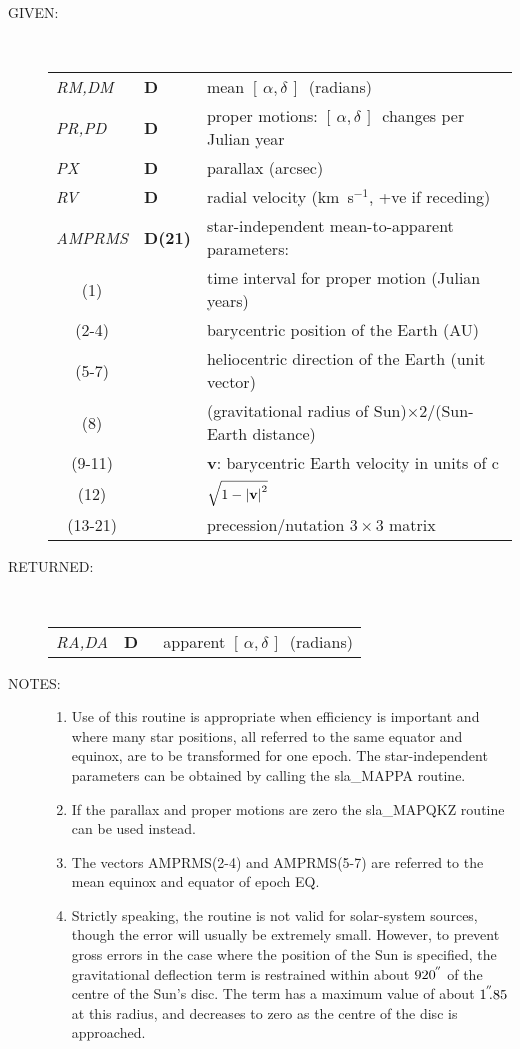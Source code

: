 \documentclass[11pt,twoside]{article}
\newcommand{\radec}     {$[\,\alpha,\delta\,]$}
\newcommand{\arcsec}[2] {\arcseci{#1}$\hspace{-0.4em}.#2$}
\newcommand{\arcsec}[2] {
      {$#1\hspace{-0.05em}^{'\hspace{-0.1em}'}\hspace{-0.4em}.#2$}
   }
\newcommand{\arcseci}[1] {$#1\hspace{-0.05em}$\raisebox{-0.5ex}
                         {$^{'\hspace{-0.1em}'}$}}
\renewcommand{\arcseci}[1] {$#1\hspace{-0.05em}^{'\hspace{-0.1em}'}$}
\newlength{\oldspacing}
\newcommand{\args}[2]
{
  \goodbreak
  \setlength{\oldspacing}{\topsep}
  \setlength{\topsep}{0.3ex}
  \begin{description}
  \item[#1]:\\[1.5ex]
    \begin{tabular}{p{7em}p{6em}p{22em}}
      #2
    \end{tabular}
  \end{description}
  \setlength{\topsep}{\oldspacing}
}
\renewcommand{\args}[2]
   {
     \begin{description}
        \item[#1:]\\
        \begin{tabular}{p{7em}p{6em}l}
           #2
        \end{tabular}
     \end{description}
   }
\newcommand{\spec}[3]
{
  {\em {#1}} & {\bf \mbox{#2}} & {#3}
}
\newcommand{\specel}[2]
{
  \multicolumn{1}{c}{#1} & {} & {#2}
}
\newcommand{\notes}[1]
{
  \goodbreak
  \setlength{\oldspacing}{\topsep}
  \setlength{\topsep}{0.3ex}
  \begin{description}
    \item[NOTES]:
        #1
  \end{description}
  \setlength{\topsep}{\oldspacing}
}
\renewcommand{\notes}[1]
   {
      \begin{description}
         \item[NOTES:]
            #1
      \end{description}
   }
\begin{document}
\args{GIVEN}
{
 \spec{RM,DM}{D}{mean \radec\ (radians)} \\
 \spec{PR,PD}{D}{proper motions:  \radec\ changes per Julian year} \\
 \spec{PX}{D}{parallax (arcsec)} \\
 \spec{RV}{D}{radial velocity (km~s$^{-1}$, +ve if receding)} \\
 \spec{AMPRMS}{D(21)}{star-independent mean-to-apparent parameters:} \\
 \specel   {(1)}     {time interval for proper motion (Julian years)} \\
 \specel   {(2-4)}   {barycentric position of the Earth (AU)} \\
 \specel   {(5-7)}   {heliocentric direction of the Earth (unit vector)} \\
 \specel   {(8)}     {(gravitational radius of
                      Sun)$\times 2 / $(Sun-Earth distance)} \\
 \specel   {(9-11)}  {{\bf v}: barycentric Earth velocity in units of c} \\
 \specel   {(12)}    {$\sqrt{1-\left|\mbox{\bf v}\right|^2}$} \\
 \specel   {(13-21)} {precession/nutation $3\times3$ matrix}
}
\args{RETURNED}
{
 \spec{RA,DA}{D }{apparent \radec\ (radians)}
}
\notes
{
 \begin{enumerate}
  \item Use of this routine is appropriate when efficiency is important
        and where many star positions, all referred to the same equator
        and equinox, are to be transformed for one epoch.  The
        star-independent parameters can be obtained by calling the
        sla\_MAPPA routine.
  \item If the parallax and proper motions are zero the sla\_MAPQKZ
        routine can be used instead.
  \item The vectors AMPRMS(2-4) and AMPRMS(5-7) are referred to
        the mean equinox and equator of epoch EQ.
  \item Strictly speaking, the routine is not valid for solar-system
        sources, though the error will usually be extremely small.
        However, to prevent gross errors in the case where the
        position of the Sun is specified, the gravitational
        deflection term is restrained within about \arcseci{920} of the
        centre of the Sun's disc.  The term has a maximum value of
        about \arcsec{1}{85} at this radius, and decreases to zero as
        the centre of the disc is approached.
 \end{enumerate}
}
\end{document}
